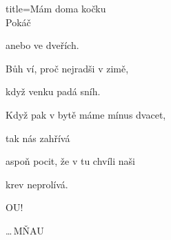 \begin{song}{title=\centering Mám doma kočku\\\normalsize Pokáč \vspace*{-0.3cm}}
{\begin{minipage}[t]{0.5\textwidth}
   anebo ve dveřích.
   
   Bůh ví, proč nejradši v zimě,
   
   když venku padá sníh.
   
   
\sloka
   Když pak v bytě máme mínus dvacet,
   
   tak nás zahřívá
   
   aspoň pocit, že v tu chvíli naši
   
   krev neprolívá.
   
   OU!
   
   
\elipsa\ldots\,MŇAU
   
\end{minipage}   
}
\setcounter{Slokočet}{0}
\end{song}
